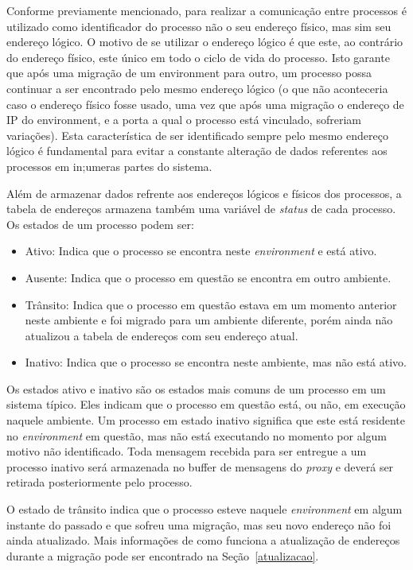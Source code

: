 Conforme previamente mencionado, para realizar a comunicação entre processos é utilizado como identificador do processo não o seu endereço físico, mas sim seu endereço lógico. O motivo de se utilizar o endereço lógico é que este, ao contrário do endereço físico, este único em todo o ciclo de vida do processo. Isto garante que após uma migração de um environment para outro, um processo possa continuar a ser encontrado pelo mesmo endereço lógico (o que não aconteceria caso o endereço físico fosse usado, uma vez que após uma migração o endereço de IP do environment, e a porta a qual o processo está vinculado, sofreriam variações). Esta característica de ser identificado sempre pelo mesmo endereço lógico é fundamental para evitar a constante alteração de dados referentes aos processos em in;umeras partes do sistema.

Além de armazenar dados refrente aos endereços lógicos e físicos dos processos, a tabela de endereços armazena também uma variável de \textit{status} de cada processo. Os estados de um processo podem ser:

\begin{itemize}
\item Ativo: Indica que o processo se encontra neste \textit{environment} e está ativo. 
\item Ausente: Indica que o processo em questão se encontra em outro ambiente.
\item Trânsito: Indica que o processo em questão estava em um momento anterior neste ambiente e foi migrado para um ambiente diferente, porém ainda não atualizou a tabela de endereços com seu endereço atual.
\item Inativo: Indica que o processo se encontra neste ambiente, mas não está ativo.
\end{itemize}

Os estados ativo e inativo são os estados mais comuns de um processo em um sistema típico. Eles indicam que o processo em questão está, ou não, em execução naquele ambiente. Um processo em estado inativo significa que este está residente no \textit{environment} em questão, mas não está executando no momento por algum motivo não identificado. Toda mensagem recebida para ser entregue a um processo inativo será armazenada no buffer de mensagens do \textit{proxy} e deverá ser retirada posteriormente pelo processo.

O estado de trânsito indica que o processo esteve naquele \textit{environment} em algum instante do passado e que sofreu uma migração, mas seu novo endereço não foi ainda atualizado. Mais informações de como funciona a atualização de endereços durante a migração pode ser encontrado na Seção~\ref{atualizacao}.

